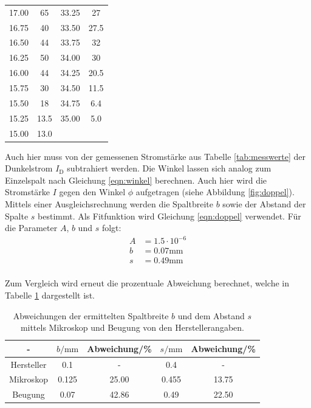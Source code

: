\begin{table}
\begin{tabular}{c c | c c}
17.00 & 65 & 	33.25 & 27 \\
16.75 & 40 &	33.50 & 27.5 \\
16.50 & 44 &	33.75 & 32 \\
16.25 & 50 &	34.00 & 30 \\
16.00 & 44 &	34.25 & 20.5 \\
15.75 & 30 &	34.50 & 11.5 \\
15.50 & 18	& 34.75 & 6.4 \\
15.25 & 13.5	& 35.00 & 5.0 \\
15.00 & 13.0	\\
\bottomrule
\end{tabular}
\end{table}

Auch hier muss von der gemessenen Stromstärke aus Tabelle \ref{tab:messwerte} der Dunkelstrom $I_\mathrm{D}$ subtrahiert werden. Die Winkel lassen sich analog zum Einzelspalt nach Gleichung \ref{eqn:winkel} berechnen. Auch hier wird die Stromstärke $I$ gegen den Winkel $\phi$ aufgetragen (siehe Abbildung \ref{fig:doppel}). Mittels einer Ausgleichsrechnung werden die Spaltbreite $b$ sowie der Abstand der Spalte $s$ bestimmt. Als Fitfunktion wird Gleichung \ref{eqn:doppel} verwendet.
Für die Parameter $A$, $b$ und $s$ folgt:
\begin{align}
  A&=1.5 \cdot 10^{-6} \\
  b&=0.07 \si{\milli\meter} \\
  s&=0.49 \si{\milli\meter} \\
\end{align}

Zum Vergleich wird erneut die prozentuale Abweichung berechnet, welche in Tabelle \ref{tab:abweichung2} dargestellt ist.

\begin{table}
  \caption{Abweichungen der ermittelten Spaltbreite $b$ und dem Abstand $s$ mittels Mikroskop und Beugung von den Herstellerangaben.}
  \centering
  \label{tab:abweichung2}
  \begin{tabular}{c c c c c}
    \toprule
   - & $b/\si{\milli\meter}$ & Abweichung/\% & $s/\si{\milli\meter}$ & Abweichung/\%\\
   \midrule
   Hersteller & 0.1 & - & 0.4 & -\\
   Mikroskop & 0.125 & 25.00 & 0.455 & 13.75 \\
   Beugung & 0.07 & 42.86 & 0.49 & 22.50 \\
   \bottomrule
   \end{tabular}
\end{table}
